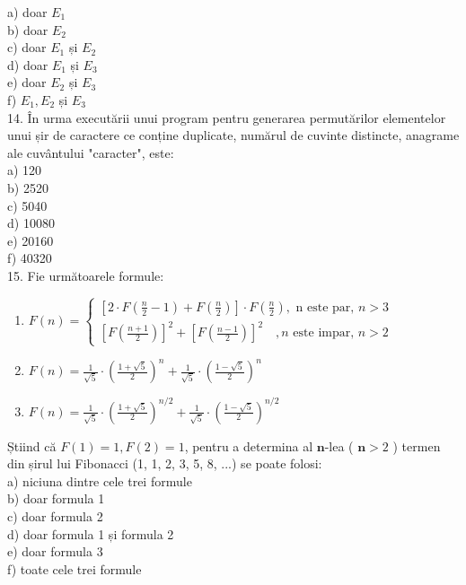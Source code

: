 a) doar $E_{1}$\\
b) doar $E_{2}$\\
c) doar $E_{1}$ și $E_{2}$\\
d) doar $E_{1}$ și $E_{3}$\\
e) doar $E_{2}$ și $E_{3}$\\
f) $E_{1}, E_{2}$ și $E_{3}$\\
14. În urma executării unui program pentru generarea permutărilor elementelor unui șir de caractere ce conține duplicate, numărul de cuvinte distincte, anagrame ale cuvântului "caracter", este:\\
a) 120\\
b) 2520\\
c) 5040\\
d) 10080\\
e) 20160\\
f) 40320\\
15. Fie următoarele formule:

\begin{enumerate}
  \item $F(n)=\left\{\begin{array}{l}{\left[2 \cdot F\left(\frac{n}{2}-1\right)+F\left(\frac{n}{2}\right)\right] \cdot F\left(\frac{n}{2}\right), \text { n este par, } n>3} \\ {\left[F\left(\frac{n+1}{2}\right)\right]^{2}+\left[F\left(\frac{n-1}{2}\right)\right]^{2} \quad, n \text { este impar, } n>2}\end{array}\right.$
  \item $F(n)=\frac{1}{\sqrt{5}} \cdot\left(\frac{1+\sqrt{5}}{2}\right)^{n}+\frac{1}{\sqrt{5}} \cdot\left(\frac{1-\sqrt{5}}{2}\right)^{n}$
  \item $F(n)=\frac{1}{\sqrt{5}} \cdot\left(\frac{1+\sqrt{5}}{2}\right)^{n / 2}+\frac{1}{\sqrt{5}} \cdot\left(\frac{1-\sqrt{5}}{2}\right)^{n / 2}$
\end{enumerate}

Știind că $F(1)=1, F(2)=1$, pentru a determina al $\mathbf{n}$-lea ( $\mathbf{n}>2$ ) termen din șirul lui Fibonacci (1, 1, 2, 3, 5, 8, ...) se poate folosi:\\
a) niciuna dintre cele trei formule\\
b) doar formula 1\\
c) doar formula 2\\
d) doar formula 1 și formula 2\\
e) doar formula 3\\
f) toate cele trei formule

